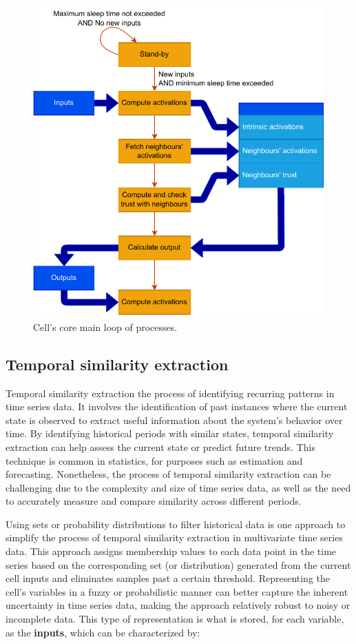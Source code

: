\begin{figure}[h!]
    \centering
    \includegraphics[width=12cm]{figures/chapter4/cell/processes.pdf}
    \caption{Cell's core main loop of processes.}
    \label{fig:cellprocesses}
\end{figure}


\subsection{Temporal similarity extraction} \label{subsec:tempsim}

Temporal similarity extraction the process of identifying recurring patterns in time series data. It involves the identification of past instances where the current state is observed to extract useful information about the system's behavior over time. By identifying historical periods with similar states, temporal similarity extraction can help assess the current state or predict future trends. This technique is common in statistics, for purposes such as estimation and forecasting. Nonetheless, the process of temporal similarity extraction can be challenging due to the complexity and size of time series data, as well as the need to accurately measure and compare similarity across different periods.

Using sets or probability distributions to filter historical data is one approach to simplify the process of temporal similarity extraction in multivariate time series data. This approach assigns membership values to each data point in the time series based on the corresponding set (or distribution) generated from the current cell inputs and eliminates samples past a certain threshold. Representing the cell's variables in a fuzzy or probabilistic manner can better capture the inherent uncertainty in time series data, making the approach relatively robust to noisy or incomplete data. This type of representation is what is stored, for each variable, as the \textbf{inputs}, which can be characterized by:

